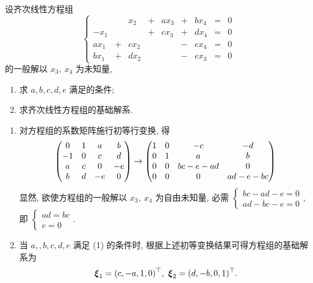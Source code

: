 \begin{example}[2005 南开大学]
    设齐次线性方程组 $$\left\{\begin{matrix}
                 &   & x_2  & + & ax_3 & + & bx_4 & = & 0 \\
            -x_1 &   &      & + & cx_3 & + & dx_4 & = & 0 \\
            ax_1 & + & cx_2 &   &      & - & ex_4 & = & 0 \\
            bx_1 & + & dx_2 &   &      & - & ex_3 & = & 0
        \end{matrix}\right.$$
    的一般解以 $x_3,~x_4$ 为未知量,
    \begin{enumerate}[label=(\arabic{*})]
        \item 求 $a,b,c,d,e$ 满足的条件;
        \item 求齐次线性方程组的基础解系.
    \end{enumerate}
\end{example}
\begin{solution}
    \begin{enumerate}[label=(\arabic{*})]
        \item 对方程组的系数矩阵施行初等行变换, 得 $$\mqty(0&1&a&b\\-1&0&c&d\\a&c&0&-e\\b&d&-e&0)\to\mqty(1&0&-c&-d\\0&1&a&b\\0&0&bc-e-ad&0\\0&0&0&ad-e-bc)$$
              显然, 欲使方程组的一般解以 $x_3,~x_4$ 为自由未知量, 必需 $\begin{cases}
                      bc-ad-e=0 \\
                      ad-bc-e=0
                  \end{cases}$, 即 $\begin{cases}
                      ad=bc \\e=0
                  \end{cases}$.
        \item 当 $a,,b,c,d,e$ 满足 (1) 的条件时, 根据上述初等变换结果可得方程组的基础解系为
              $$\vb*{\xi}_1=(c,-a,1,0)^\top,~\vb*{\xi}_2=(d,-b,0,1)^\top.$$
    \end{enumerate}
\end{solution}

